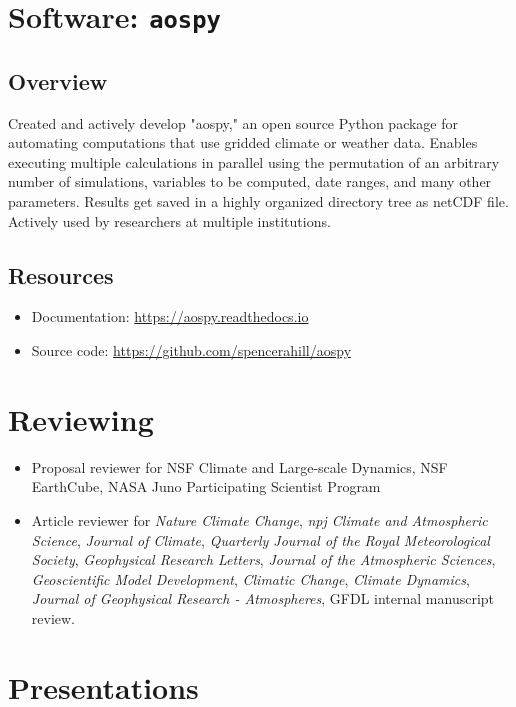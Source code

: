 \documentclass[12pt,letterpaper]{shillcv}
\begin{document}
\section*{Software: \texttt{aospy}}
\label{sec:org370c809}
\subsection*{Overview}
\label{sec:orgc01fdff}
Created and actively develop "aospy," an open source Python package for
automating computations that use gridded climate or weather data.  Enables
executing multiple calculations in parallel using the permutation of an
arbitrary number of simulations, variables to be computed, date ranges, and many
other parameters.  Results get saved in a highly organized directory tree as
netCDF file.  Actively used by researchers at multiple institutions.

\subsection*{Resources}
\label{sec:orgb70f756}
\begin{itemize}
\item Documentation: \url{https://aospy.readthedocs.io}
\item Source code: \url{https://github.com/spencerahill/aospy}
\end{itemize}
\section*{Reviewing}
\label{sec:org887fc21}
\begin{itemize}
\item Proposal reviewer for NSF Climate and Large-scale Dynamics, NSF EarthCube,
NASA Juno Participating Scientist Program
\item Article reviewer for \emph{Nature Climate Change}, \emph{npj Climate and Atmospheric
Science}, \emph{Journal of Climate}, \emph{Quarterly Journal of the Royal Meteorological
Society}, \emph{Geophysical Research Letters}, \emph{Journal of the Atmospheric
Sciences}, \emph{Geoscientific Model Development}, \emph{Climatic Change}, \emph{Climate
Dynamics}, \emph{Journal of Geophysical Research - Atmospheres}, GFDL internal
manuscript review.
\end{itemize}

\section*{Presentations}
\label{sec:org9e320c1}
\end{document}

